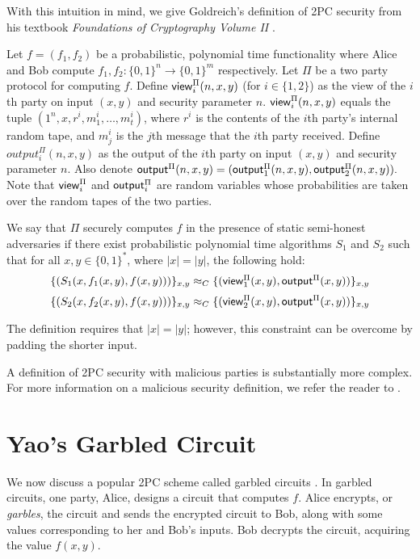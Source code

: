 With this intuition in mind, we give Goldreich's definition of 2PC security from his textbook \textit{Foundations of Cryptography Volume II} \cite{goldreich}.

\begin{definition}
Let $f = (f_1, f_2)$ be a probabilistic, polynomial time functionality where Alice and Bob compute $f_1, f_2: \{0,1\}^n \to \{0,1\}^m$ respectively.
Let $\Pi$ be a two party protocol for computing $f$. 
Define ${\sf view}_i^{\Pi}(n,x,y)$ (for $i \in \{1,2\}$) as the view of the $i$th party on input $(x,y)$ and security parameter $n$.
${\sf view}_i^{\Pi}(n,x,y)$ equals the tuple $(1^n, x, r^i, m_1^i, \ldots, m_t^i)$, where $r^i$ is the contents of the $i$th party's internal random tape, and $m_j^i$ is the $j$th message that the $i$th party received.
Define $output^{\Pi}_i(n,x,y)$ as the output of the $i$th party on input $(x,y)$ and security parameter $n$.
Also denote $ {\sf output}^{\Pi}(n,x,y) = ({\sf output}^{\Pi}_1(n,x,y), {\sf output}^{\Pi}_2(n,x,y)).$
Note that ${\sf view}^{\Pi}_i$ and ${\sf output}^{\Pi}_i$ are random variables whose probabilities are taken over the random tapes of the two parties. 

We say that $\Pi$ securely computes $f$ in the presence of static semi-honest adversaries if there exist probabilistic polynomial time algorithms $S_1$ and $S_2$ such that for all $x,y \in \{0,1\}^*$, where $|x| = |y|$, the following hold:
\begin{equation} 
    \label{eqn:secdef1}
    \{(S_1(x, f_1(x,y), f(x,y)))\}_{x,y} \approx_C \{({\sf view}^{\Pi}_1(x,y), {\sf output}^{\Pi}(x,y)) \}_{x,y} 
\end{equation}
\begin{equation} 
    \label{eqn:secdef2}
    \{(S_2(x, f_2(x,y), f(x,y)))\}_{x,y} \approx_C \{({\sf view}^{\Pi}_2(x,y), {\sf output}^{\Pi}(x,y)) \}_{x,y} 
\end{equation}
\end{definition}

The definition requires that $|x| = |y|$; however, this constraint can be overcome by padding the shorter input.

A definition of 2PC security with malicious parties is substantially more complex.
For more information on a malicious security definition, we refer the reader to \cite{lindell2009}.

\section{Yao's Garbled Circuit}
We now discuss a popular 2PC scheme called garbled circuits \cite{yao86}.
In garbled circuits, one party, Alice, designs a circuit that computes $f$.
Alice encrypts, or \textit{garbles}, the circuit and sends the encrypted circuit to Bob, along with some values corresponding to her and Bob's inputs.
Bob decrypts the circuit, acquiring the value $f(x,y)$.

